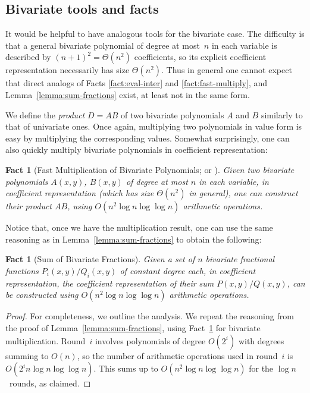 \documentclass[11pt]{article}
\newtheorem{fact}[theorem]{Fact}
\theoremstyle{remark}
\begin{document}
\subsection{Bivariate tools and facts}
\label{sec:bivariate-tools}

It would be helpful to have analogous tools for the bivariate case.
The difficulty is that a general bivariate polynomial of degree at most~$n$ in
each variable is described by $(n+1)^2 = \Theta(n^2)$ coefficients, so its
explicit coefficient representation necessarily has size $\Theta(n^2)$.  Thus
in general one cannot expect that direct analogs of
Facts \ref{fact:eval-inter} and \ref{fact:fast-multiply}, and
Lemma~\ref{lemma:sum-fractions} exist, at least not in the same form.

We define the \emph{product} $D=A B$ of two bivariate polynomials
$A$ and $B$ similarly to that of univariate ones.  Once again,
multiplying two polynomials in value form is easy by multiplying the
corresponding values.  Somewhat surprisingly, one can also quickly
multiply bivariate polynomials in coefficient representation:

\begin{fact}[Fast Multiplication of Bivariate Polynomials; \cite{p-smpm-94,bp-pmcfa-94} or {\cite[Corollary 8.28]{gg-mca-99}}]
  \label{fact:multiply-binomial}
  Given two bivariate polynomials $A(x,y)$, $B(x,y)$ of degree at most
  $n$ in each variable, in coefficient representation (which has size
  $\Theta(n^2)$ in general), one can construct their product $AB$,
  using $O(n^2 \log n \log \log n)$ arithmetic operations.
\end{fact}



Notice that, once we have the multiplication result, one can use the
same reasoning as in Lemma~\ref{lemma:sum-fractions} to obtain the
following:


\begin{fact}[Sum of Bivariate Fractions]
  \label{fact:sum-fractions-bi}
  Given a set of $n$ bivariate fractional functions
  $P_i(x,y)/Q_i(x,y)$ of constant degree each, in coefficient
  representation, the coefficient representation of their sum
  $P(x,y)/Q(x,y)$, can be constructed using $O(n^2 \log n \log \log n)$
  arithmetic operations.
\end{fact}

\begin{proof}
  For completeness, we outline the analysis. 
  We repeat the reasoning from the proof of Lemma~\ref{lemma:sum-fractions}, using Fact~\ref{fact:multiply-binomial} for bivariate multiplication.
  Round~$i$ involves polynomials of degree $O(2^i)$ with degrees summing to $O(n)$, so the number of arithmetic operations used in round~$i$ is $O(2^i n \log n \log \log n)$.  This sums up to $O(n^2 \log n \log \log n)$ for the $\log n$~rounds, as claimed.
\end{proof}
\end{document}
